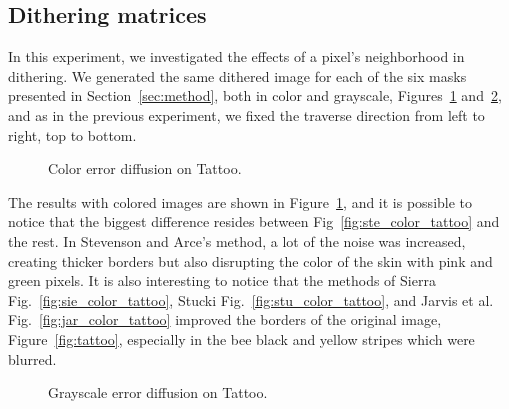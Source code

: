 \documentclass[conference]{IEEEtran}
\begin{document}
\subsection{Dithering matrices}
\label{ssec:matrix}
In this experiment, we investigated the effects of a pixel's neighborhood in dithering. We generated the same dithered image for each of the six masks presented in Section~\ref{sec:method}, both in color and grayscale, Figures~\ref{fig:color_error_diffusion} and~\ref{fig:gray_error_diffusion}, and as in the previous experiment, we fixed the traverse direction from left to right, top to bottom.
\begin{figure}[htbp]
	\centering
    \quad
	\quad
	\caption{Color error diffusion on Tattoo.}
	\label{fig:color_error_diffusion}
\end{figure}\par
The results with colored images are shown in Figure~\ref{fig:color_error_diffusion}, and it is possible to notice that the biggest difference resides between Fig~\ref{fig:ste_color_tattoo} and the rest. In Stevenson and Arce's method, a lot of the noise was increased, creating thicker borders but also disrupting the color of the skin with pink and green pixels. It is also interesting to notice that the methods of Sierra Fig.~\ref{fig:sie_color_tattoo}, Stucki Fig.~\ref{fig:stu_color_tattoo}, and Jarvis et al. Fig.~\ref{fig:jar_color_tattoo} improved the borders of the original image, Figure~\ref{fig:tattoo}, especially in the bee black and yellow stripes which were blurred.
\begin{figure}[htbp]
	\centering
    \quad
	\quad
	\caption{Grayscale error diffusion on Tattoo.}
	\label{fig:gray_error_diffusion}
\end{figure}\par
\end{document}
